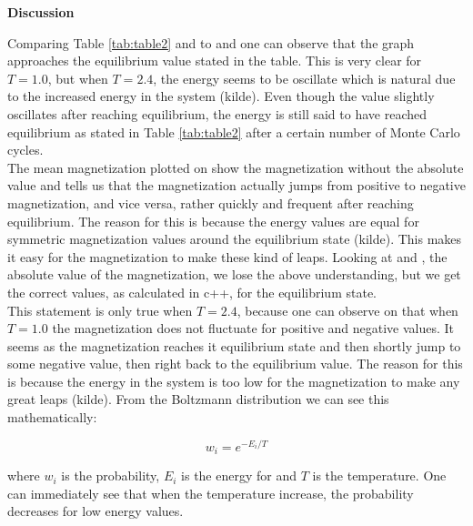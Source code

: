 \documentclass[10pt,a4paper]{article}
\begin{document}
\newpage

\begin{center}
{\LARGE\bf Discussion}
\end{center}

\noindent Comparing Table \ref{tab:table2} and to  and  one can observe that the graph approaches the equilibrium value stated in the table. This is very clear for $T = 1.0$, but when $T = 2.4$, the energy seems to be oscillate which is natural due to the increased energy in the system (kilde). Even though the value slightly oscillates after reaching equilibrium, the energy is still said to have reached equilibrium as stated in Table \ref{tab:table2} after a certain number of Monte Carlo cycles.
\\
The mean magnetization plotted on  show the magnetization without the absolute value and tells us that the magnetization actually jumps from positive to negative magnetization, and vice versa, rather quickly and frequent after reaching equilibrium. The reason for this is because the energy values are equal for symmetric magnetization values around the equilibrium state (kilde). This makes it easy for the magnetization to make these kind of leaps. Looking at  and , the absolute value of the magnetization, we lose the above understanding, but we get the correct values, as calculated in c++, for the equilibrium state.
\\
This statement is only true when $T = 2.4$, because one can observe on  that when $T = 1.0$ the magnetization does not fluctuate for positive and negative values. It seems as the magnetization reaches it equilibrium state and then shortly jump to some negative value, then right back to the equilibrium value. The reason for this is because the energy in the system is too low for the magnetization to make any great leaps (kilde). From the Boltzmann distribution we can see this mathematically:

$$
w_i = e^{-E_i/T}
$$

\noindent where $w_i$ is the probability, $E_i$ is the energy for and $T$ is the temperature. One can immediately see that when the temperature increase, the probability decreases for low energy values.
\end{document}
